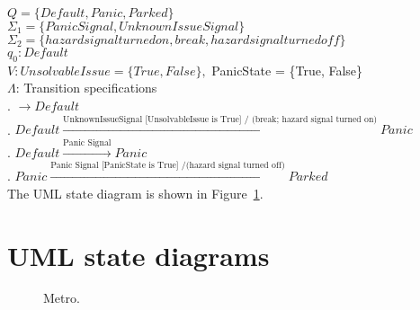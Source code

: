 \documentclass[12pt]{article}
\begin{document}
\begin{spacing}{1.5}
\noindent $Q = \{Default, Panic, Parked\}$\\
\noindent $\Sigma_1 = \{Panic Signal, UnknownIssueSignal\}$\\
\noindent $\Sigma_2 = \{hazard signal turned on, break, hazard signal turned off\}$\\
\noindent $q_0: Default$\\
\noindent $V: UnsolvableIssue = \{True, False\}, $ PanicState = \{True, False\}\\
\noindent $\Lambda$: Transition specifications\\

. $\rightarrow Default$\\
. $Default \xrightarrow {\text {UnknownIssueSignal [UnsolvableIssue is True] / (break; hazard signal turned on)}} Panic$\\
. $Default \xrightarrow {\text {Panic Signal}} Panic$\\
. $Panic \xrightarrow {\text {Panic Signal [PanicState is True] /(hazard signal turned off)}} Parked$\\


\noindent The UML state diagram is shown in Figure~\ref{fig:metro-fig}.

\newpage
\section{UML state diagrams}

\begin{figure}[h!]
	\centering
		
		  \caption{Metro.}
  \label{fig:metro-fig}
\end{figure}

\end{spacing}
\end{document}
